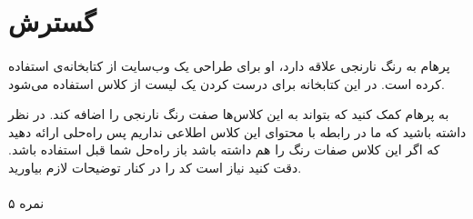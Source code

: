 \documentclass[../main.tex]{subfiles}
\begin{document}
\section{گسترش }

\paragraph{}
پرهام به رنگ نارنجی علاقه دارد، او برای طراحی یک وب‌سایت از کتابخانه‌ی
استفاده کرده است. در این کتابخانه برای درست کردن
یک لیست از کلاس 
استفاده می‌شود.

به پرهام کمک کنید که بتواند به این کلاس‌ها صفت رنگ نارنجی را اضافه کند.
در نظر داشته باشید که ما در رابطه با محتوای این کلاس اطلاعی نداریم
پس راه‌حلی ارائه دهید که اگر این کلاس صفات رنگ را هم داشته باشد باز راه‌حل شما قبل استفاده باشد.
دقت کنید نیاز است کد  را در کنار توضیحات لازم بیاورید.

\paragraph{}
۵ نمره
\end{document}
